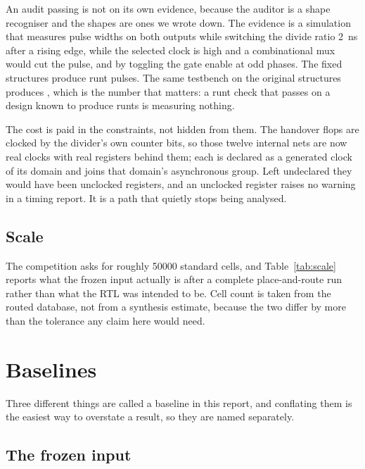 \documentclass[11pt,a4paper]{article}
\begin{document}
An audit passing is not on its own evidence, because the auditor is a shape
recogniser and the shapes are ones we wrote down. The evidence is a
simulation that measures pulse widths on both outputs while switching the
divide ratio \SI{2}{\nano\second} after a rising edge, while the
selected clock is high and a combinational mux would cut the pulse, and by
toggling the gate enable at odd phases. The fixed structures produce \runtsfixed{} runt
pulses. The same testbench on the original structures produces
\runtscontrol{}, which is the number that matters: a runt check that passes
on a design known to produce runts is measuring nothing.

The cost is paid in the constraints, not hidden from them. The handover flops
are clocked by the divider's own counter bits, so those twelve internal nets
are now real clocks with real registers behind them; each is declared as a
generated clock of its domain and joins that domain's asynchronous group. Left
undeclared they would have been unclocked registers, and an unclocked register
raises no warning in a timing report. It is a path that quietly stops being
analysed.





\subsection{Scale}

The competition asks for roughly \num{50000} standard cells, and
Table~\ref{tab:scale} reports what the frozen input actually is after a
complete place-and-route run rather than what the RTL was intended to be.
Cell count is taken from the routed database, not from a synthesis estimate,
because the two differ by more than the tolerance any claim here would need.



\section{Baselines}

Three different things are called a baseline in this report, and conflating
them is the easiest way to overstate a result, so they are named separately.

\subsection{The frozen input}
\end{document}
